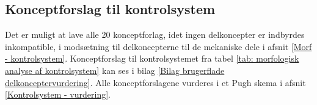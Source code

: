 \subsection{Konceptforslag til kontrolsystem} \label{Konceptforlag - kontrolsystem}

Det er muligt at lave alle 20 konceptforlag, idet ingen delkoncepter er indbyrdes inkompatible, i modsætning til delkoncepterne til de mekaniske dele i afsnit \ref{Morf - kontrolsystem}. Konceptforslag til kontrolsystemet fra tabel \ref{tab: morfologisk analyse af kontrolsystem} kan ses i bilag \ref{Bilag brugerflade delkonceptervurdering}.  Alle konceptforslagene vurderes i et Pugh skema i afsnit \ref{Kontrolsystem - vurdering}.



